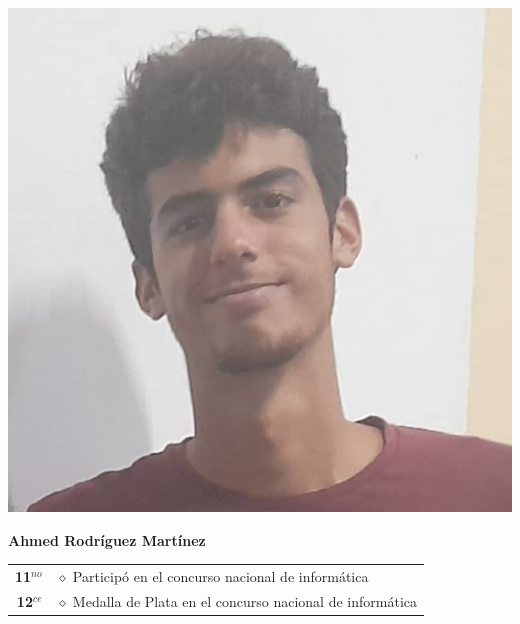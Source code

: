 \pagebreak

\vspace*{0.2in}

\begin{minipage}{0.2\textwidth}
	\includegraphics[width=\linewidth]{img/concursantes/ahmed.png} %
\end{minipage}
\hfill
\begin{minipage}{0.7\textwidth}
	\textbf{Ahmed Rodríguez Martínez}
	
	\vspace*{0.1in}
	\begin{tabular}{rl}
		
		
		\textbf{11$^{no}$} & $\diamond$ Participó en el concurso nacional de informática \\
		
		\textbf{12$^{ce}$} & $\diamond$ Medalla de Plata en el concurso nacional de informática \\
		
		
	\end{tabular}
\end{minipage}

\vspace*{0.2in}

